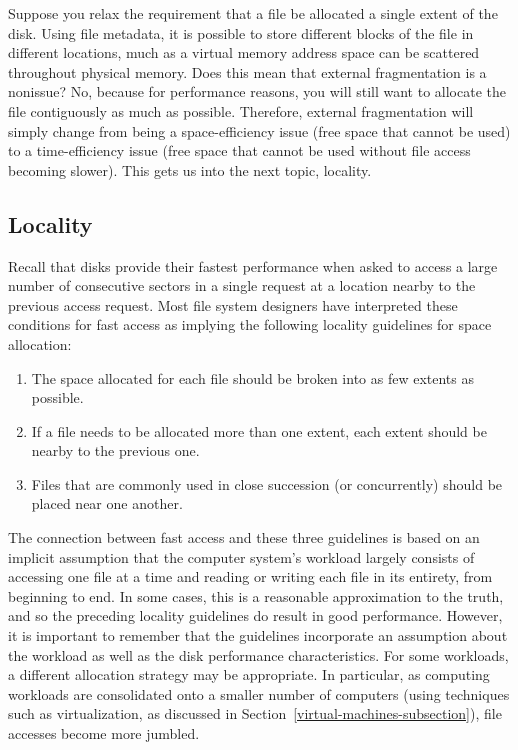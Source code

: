 Suppose you relax the requirement that a file be allocated a single
extent of the disk.  Using file metadata, it is possible to
store different blocks of the file in different locations, much as a
virtual memory address space can be scattered throughout physical
memory.  Does this mean that external fragmentation is a nonissue?
No, because for performance reasons, you will still want to allocate
the file contiguously as much as possible.  Therefore, external
fragmentation will simply change from being a space-efficiency issue
(free space that cannot be used) to a time-efficiency issue (free
space that cannot be used without file access becoming slower).  This
gets us into the next topic, locality.

\subsection{Locality}\label{locality-section}

Recall that disks provide their fastest performance when asked to
access a large number of consecutive sectors in a single request at a
location nearby to the previous access request. Most file system
designers have interpreted these conditions for fast access as implying the following
locality guidelines for space allocation:
\begin{enumerate}
\item The space allocated for each file should be broken into as few
extents as possible.
\item If a file needs to be allocated more than one extent, each
extent should be nearby to the previous one.
\item Files that are commonly used in close succession (or
concurrently) should be placed near one another.
\end{enumerate}

The connection between fast access and these three guidelines is
based on an implicit assumption that the computer system's
workload largely consists of accessing one file at a time and reading
or writing each file in its entirety, from beginning to end.  In some
cases, this is a reasonable approximation to the truth, and so the
preceding locality guidelines do result in good performance.
However, it is important to remember that the guidelines incorporate
an assumption about the workload as well as the disk performance
characteristics.  For some workloads, a different allocation strategy
may be appropriate.  In particular, as computing workloads are
consolidated onto a smaller number of computers
(using techniques such as virtualization, as discussed in Section~\ref{virtual-machines-subsection}),
file accesses become more jumbled.

